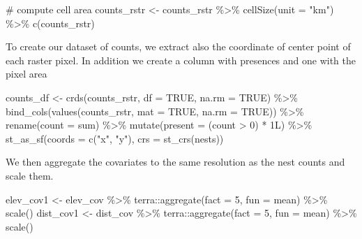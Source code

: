 \documentclass[
  letterpaper,
  DIV=11,
  numbers=noendperiod]{scrartcl}
\newenvironment{Shaded}{\begin{snugshade}}{\end{snugshade}}
\newcommand{\AttributeTok}[1]{\textcolor[rgb]{0.40,0.45,0.13}{#1}}
\newcommand{\CommentTok}[1]{\textcolor[rgb]{0.37,0.37,0.37}{#1}}
\newcommand{\ConstantTok}[1]{\textcolor[rgb]{0.56,0.35,0.01}{#1}}
\newcommand{\DecValTok}[1]{\textcolor[rgb]{0.68,0.00,0.00}{#1}}
\newcommand{\FunctionTok}[1]{\textcolor[rgb]{0.28,0.35,0.67}{#1}}
\newcommand{\NormalTok}[1]{\textcolor[rgb]{0.00,0.23,0.31}{#1}}
\newcommand{\OtherTok}[1]{\textcolor[rgb]{0.00,0.23,0.31}{#1}}
\newcommand{\SpecialCharTok}[1]{\textcolor[rgb]{0.37,0.37,0.37}{#1}}
\newcommand{\StringTok}[1]{\textcolor[rgb]{0.13,0.47,0.30}{#1}}
\begin{document}
\begin{Shaded}
\begin{Highlighting}[]
\CommentTok{\# compute cell area}
\NormalTok{counts\_rstr }\OtherTok{\textless{}{-}}\NormalTok{ counts\_rstr }\SpecialCharTok{\%\textgreater{}\%}
  \FunctionTok{cellSize}\NormalTok{(}\AttributeTok{unit =} \StringTok{"km"}\NormalTok{) }\SpecialCharTok{\%\textgreater{}\%}
  \FunctionTok{c}\NormalTok{(counts\_rstr)}
\end{Highlighting}
\end{Shaded}

To create our dataset of counts, we extract also the coordinate of
center point of each raster pixel. In addition we create a column with
presences and one with the pixel area

\begin{Shaded}
\begin{Highlighting}[]
\NormalTok{counts\_df }\OtherTok{\textless{}{-}} \FunctionTok{crds}\NormalTok{(counts\_rstr, }\AttributeTok{df =} \ConstantTok{TRUE}\NormalTok{, }\AttributeTok{na.rm =} \ConstantTok{TRUE}\NormalTok{) }\SpecialCharTok{\%\textgreater{}\%}
  \FunctionTok{bind\_cols}\NormalTok{(}\FunctionTok{values}\NormalTok{(counts\_rstr, }\AttributeTok{mat =} \ConstantTok{TRUE}\NormalTok{, }\AttributeTok{na.rm =} \ConstantTok{TRUE}\NormalTok{)) }\SpecialCharTok{\%\textgreater{}\%}
  \FunctionTok{rename}\NormalTok{(}\AttributeTok{count =}\NormalTok{ sum) }\SpecialCharTok{\%\textgreater{}\%}
  \FunctionTok{mutate}\NormalTok{(}\AttributeTok{present =}\NormalTok{ (count }\SpecialCharTok{\textgreater{}} \DecValTok{0}\NormalTok{) }\SpecialCharTok{*} \DecValTok{1}\NormalTok{L) }\SpecialCharTok{\%\textgreater{}\%}
  \FunctionTok{st\_as\_sf}\NormalTok{(}\AttributeTok{coords =} \FunctionTok{c}\NormalTok{(}\StringTok{"x"}\NormalTok{, }\StringTok{"y"}\NormalTok{), }\AttributeTok{crs =} \FunctionTok{st\_crs}\NormalTok{(nests))}
\end{Highlighting}
\end{Shaded}

We then aggregate the covariates to the same resolution as the nest
counts and scale them.

\begin{Shaded}
\begin{Highlighting}[]
\NormalTok{elev\_cov1 }\OtherTok{\textless{}{-}}\NormalTok{ elev\_cov }\SpecialCharTok{\%\textgreater{}\%} 
\NormalTok{  terra}\SpecialCharTok{::}\FunctionTok{aggregate}\NormalTok{(}\AttributeTok{fact =} \DecValTok{5}\NormalTok{, }\AttributeTok{fun =}\NormalTok{ mean) }\SpecialCharTok{\%\textgreater{}\%} \FunctionTok{scale}\NormalTok{()}
\NormalTok{dist\_cov1 }\OtherTok{\textless{}{-}}\NormalTok{ dist\_cov }\SpecialCharTok{\%\textgreater{}\%} 
\NormalTok{  terra}\SpecialCharTok{::}\FunctionTok{aggregate}\NormalTok{(}\AttributeTok{fact =} \DecValTok{5}\NormalTok{, }\AttributeTok{fun =}\NormalTok{ mean) }\SpecialCharTok{\%\textgreater{}\%} \FunctionTok{scale}\NormalTok{()}
\end{Highlighting}
\end{Shaded}
\end{document}
